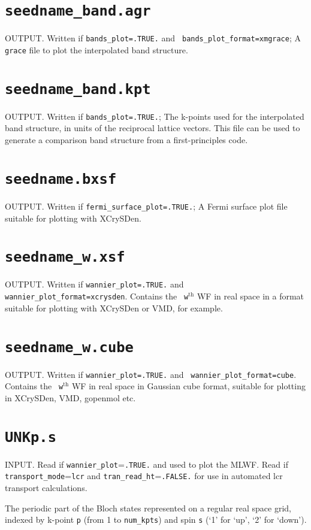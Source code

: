 \section{{\tt seedname\_band.agr}}
OUTPUT. Written if {\tt bands\_plot=.TRUE.} and {\tt
  bands\_plot\_format=xmgrace}; A {\tt grace} file to plot the
  interpolated band structure.


\section{{\tt seedname\_band.kpt}}
OUTPUT. Written if {\tt bands\_plot=.TRUE.}; The k-points used for the
interpolated band structure, in units of the reciprocal lattice
vectors. This file can be used to generate a comparison band structure
from a first-principles code.

\section{{\tt seedname.bxsf}}
OUTPUT. Written if {\tt fermi\_surface\_plot=.TRUE.}; A Fermi surface plot file
suitable for plotting with XCrySDen.

\section{{\tt seedname\_w.xsf}}
OUTPUT. Written if {\tt wannier\_plot=.TRUE.} and {\tt
  wannier\_plot\_format=xcrysden}. Contains the {\tt
  w}$^{\mathrm{th}}$ WF in real space in a format suitable for
  plotting with XCrySDen or VMD, for example.

\section{{\tt seedname\_w.cube}}
OUTPUT. Written if {\tt wannier\_plot=.TRUE.} and {\tt
  wannier\_plot\_format=cube}. Contains the {\tt
  w}$^{\mathrm{th}}$ WF in real space in Gaussian cube format,
  suitable for plotting in XCrySDen, VMD, gopenmol etc.

\section{{\tt UNKp.s}}
INPUT. Read if \verb#wannier_plot#=\verb#.TRUE.# and used to plot the
MLWF. Read if \verb#transport_mode#=\verb#lcr# and \verb#tran_read_ht#=\verb#.FALSE.# 
for use in automated lcr transport calculations.

The periodic part of the Bloch states represented on a regular real
 space grid, indexed by k-point \verb#p# (from 1 to \verb#num_kpts#)
 and spin \verb#s# (`1' for `up', `2' for `down').


